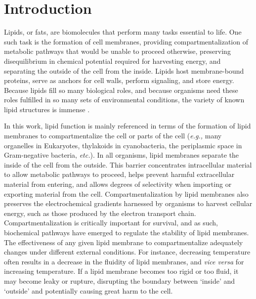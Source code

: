 \chapter[INTRODUCTION]{Introduction}


Lipids, or fats, are biomolecules that perform many tasks essential to life. One such task is the formation of cell membranes, providing compartmentalization of metabolic pathways that would be unable to proceed otherwise, preserving disequilibrium in chemical potential required for harvesting energy, and separating the outside of the cell from the inside. Lipids host membrane-bound proteins, serve as anchors for cell walls, perform signaling, and store energy. Because lipids fill so many biological roles, and because organisms need these roles fulfilled in so many sets of environmental conditions, the variety of known lipid structures is immense \citep[\textit{e.g.,}][]{Sturt_Intact_2004, belin2018hopanoid, van2008membrane, Yoshinaga_Systematic_2011, schouten2013organic}.

In this work, lipid function is mainly referenced in terms of the formation of lipid membranes to compartmentalize the cell or parts of the cell (\textit{e.g.,} many organelles in Eukaryotes, thylakoids in cyanobacteria, the periplasmic space in Gram-negative bacteria, \textit{etc.}). In all organisms, lipid membranes separate the inside of the cell from the outside. This barrier concentrates intracellular material to allow metabolic pathways to proceed, helps prevent harmful extracellular material from entering, and allows degrees of selectivity when importing or exporting material from the cell. Compartmentalization by lipid membranes also preserves the electrochemical gradients harnessed by organisms to harvest cellular energy, such as those produced by the electron transport chain. Compartmentalization is critically important for survival, and as such, biochemical pathways have emerged to regulate the stability of lipid membranes. The effectiveness of any given lipid membrane to compartmentalize adequately changes under different external conditions. For instance, decreasing temperature often results in a decrease in the fluidity of lipid membranes, and \textit{vice versa} for increasing temperature. If a lipid membrane becomes too rigid or too fluid, it may become leaky or rupture, disrupting the boundary between `inside' and `outside' and potentially causing great harm to the cell.

